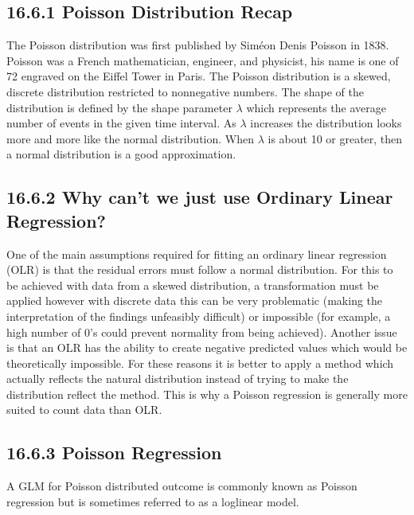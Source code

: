 \documentclass[letterpaper,10pt,english]{jupyterBook}
\begin{document}
\subsection{16.6.1 Poisson Distribution Recap}
\label{\detokenize{16.g. Generalised Linear Model (GLM):poisson-distribution-recap}}
\sphinxAtStartPar
The Poisson distribution was first published by Siméon Denis Poisson in 1838. Poisson was a French mathematician, engineer, and physicist, his name is one of 72 engraved on the Eiffel Tower in Paris. The Poisson distribution is a skewed, discrete distribution restricted to non\sphinxhyphen{}negative numbers. The shape of the distribution is defined by the shape parameter \(\lambda\) which represents the average number of events in the given time interval. As \(\lambda\) increases the distribution looks more and more like the normal distribution. When \(\lambda\) is about 10 or greater, then a normal distribution is a good approximation.


\subsection{16.6.2 Why can’t we just use Ordinary Linear Regression?}
\label{\detokenize{16.g. Generalised Linear Model (GLM):why-can-t-we-just-use-ordinary-linear-regression}}
\sphinxAtStartPar
One of the main assumptions required for fitting an ordinary linear regression (OLR) is that the residual errors must follow a normal distribution. For this to be achieved with data from a skewed distribution, a transformation must be applied however with discrete data this can be very problematic (making the interpretation of the findings unfeasibly difficult) or impossible (for example, a high number of 0’s could prevent normality from being achieved). Another issue is that an OLR has the ability to create negative predicted values which would be theoretically impossible. For these reasons it is better to apply a method which actually reflects the natural distribution instead of trying to make the distribution reflect the method. This is why a Poisson regression is generally more suited to count data than OLR.


\subsection{16.6.3 Poisson Regression}
\label{\detokenize{16.g. Generalised Linear Model (GLM):poisson-regression}}
\sphinxAtStartPar
A GLM for Poisson distributed outcome is commonly known as Poisson regression but is sometimes referred to as a log\sphinxhyphen{}linear model.
\end{document}
